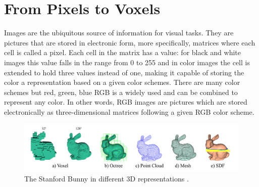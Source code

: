 


\section{From Pixels to Voxels}\label{chap2:voxels}
Images are the ubiquitous source of information for visual tasks. They are pictures that are stored in electronic form, more specifically, matrices where each cell is called a pixel. Each cell in the matrix has a value: for black and white images this value falls in the range from 0 to 255 and in color images the cell is extended to hold three values instead of one, making it capable of storing the color a representation based on a given color schemes. There are many color schemes but red, green, blue RGB is a widely used and can be combined to represent any color. In other words, RGB images are pictures which are stored electronically as three-dimensional matrices following a given RGB color scheme. 

\begin{figure}[!ht]
        \centering
        \includegraphics[width=1\textwidth]{images/3drepresentations.png}
        \caption{The Stanford Bunny in different 3D representations                     \cite{fahim2021single}
        .}
        \label{fig:3drepresentations}
\end{figure}

